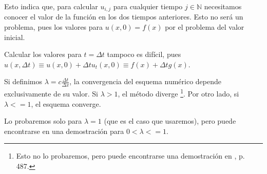 Esto indica que, para calcular $u_{i,j}$ para cualquier tiempo $j\in\mathbb{N}$ necesitamos conocer el valor de la función en los dos tiempos anteriores. Esto no será un problema, pues los valores para $u(x,0) = f(x)$ por el problema del valor inicial.

Calcular los valores para $t=\Delta t$ tampoco es difícil, pues $u(x,\Delta t) \equiv u(x,0) + \Delta t u_t(x,0) \equiv f(x) +\Delta tg(x)$.

Si definimos $\lambda = c\frac{\Delta t}{\Delta x}$, la convergencia del esquema numérico depende exclusivamente de su valor. Si $\lambda > 1$, el método diverge \footnote{Esto no lo probaremos, pero puede encontrarse una demostración en \cite{anummeth}, p. 487.}. Por otro lado, si $\lambda <=1$, el esquema converge.

Lo probaremos solo para $\lambda=1$ (que es el caso que usaremos), pero puede encontrarse en \cite{anummeth} una demostración para $0<\lambda<=1$.

